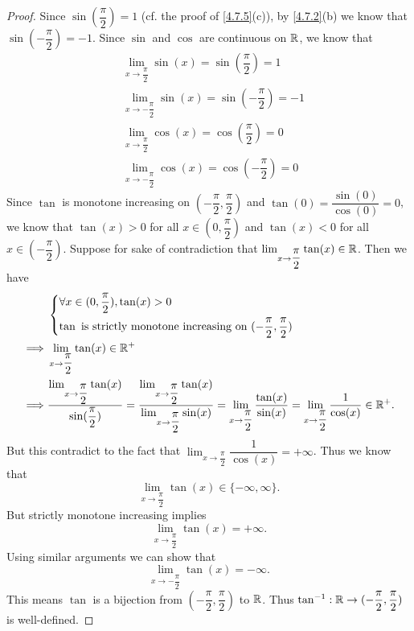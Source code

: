 \begin{proof}
  Since \(\sin(\dfrac{\pi}{2}) = 1\) (cf. the proof of \cref{4.7.5}(c)), by \cref{4.7.2}(b) we know that \(\sin(-\dfrac{\pi}{2}) = -1\).
  Since \(\sin\) and \(\cos\) are continuous on \(\mathbb{R}\), we know that
  \begin{align*}
     & \lim_{x \to \dfrac{\pi}{2}} \sin(x) = \sin(\dfrac{\pi}{2}) = 1    \\
     & \lim_{x \to -\dfrac{\pi}{2}} \sin(x) = \sin(-\dfrac{\pi}{2}) = -1 \\
     & \lim_{x \to \dfrac{\pi}{2}} \cos(x) = \cos(\dfrac{\pi}{2}) = 0    \\
     & \lim_{x \to -\dfrac{\pi}{2}} \cos(x) = \cos(-\dfrac{\pi}{2}) = 0
  \end{align*}
  Since \(\tan\) is monotone increasing on \((-\dfrac{\pi}{2}, \dfrac{\pi}{2})\) and \(\tan(0) = \dfrac{\sin(0)}{\cos(0)} = 0\), we know that \(\tan(x) > 0\) for all \(x \in (0, \dfrac{\pi}{2})\) and \(\tan(x) < 0\) for all \(x \in (-\dfrac{\pi}{2})\).
  Suppose for sake of contradiction that \(\lim_{x \to \dfrac{\pi}{2}} \tan(x) \in \mathbb{R}\).
  Then we have
  \begin{align*}
             & \begin{dcases}
                 \forall x \in (0, \dfrac{\pi}{2}), \tan(x) > 0 \\
                 \tan \text{ is strictly monotone increasing on } (-\dfrac{\pi}{2}, \dfrac{\pi}{2})
               \end{dcases}                                                                                                                                                                                      \\
    \implies & \lim_{x \to \dfrac{\pi}{2}} \tan(x) \in \mathbb{R}^+                                                                                                                                                                                                                           \\
    \implies & \dfrac{\lim_{x \to \dfrac{\pi}{2}} \tan(x)}{\sin(\dfrac{\pi}{2})} = \dfrac{\lim_{x \to \dfrac{\pi}{2}} \tan(x)}{\lim_{x \to \dfrac{\pi}{2}} \sin(x)} = \lim_{x \to \dfrac{\pi}{2}} \dfrac{\tan(x)}{\sin(x)} = \lim_{x \to \dfrac{\pi}{2}} \dfrac{1}{\cos(x)} \in \mathbb{R}^+.
  \end{align*}
  But this contradict to the fact that \(\lim_{x \to \dfrac{\pi}{2}} \dfrac{1}{\cos(x)} = +\infty\).
  Thus we know that
  \[
    \lim_{x \to \dfrac{\pi}{2}} \tan(x) \in \{-\infty, \infty\}.
  \]
  But strictly monotone increasing implies
  \[
    \lim_{x \to \dfrac{\pi}{2}} \tan(x) = +\infty.
  \]
  Using similar arguments we can show that
  \[
    \lim_{x \to -\dfrac{\pi}{2}} \tan(x) = -\infty.
  \]
  This means \(\tan\) is a bijection from \((-\dfrac{\pi}{2}, \dfrac{\pi}{2})\) to \(\mathbb{R}\).
  Thus \(\tan^{-1} : \mathbb{R} \to (-\dfrac{\pi}{2}, \dfrac{\pi}{2})\) is well-defined.


\end{proof}
